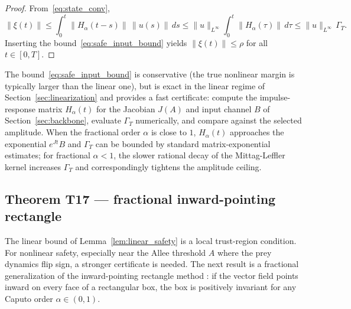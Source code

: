 \begin{proof}
From~\eqref{eq:state_conv},
\[
\|\xi(t)\| \le \int_0^t \|H_\alpha(t - s)\|\,\|u(s)\|\, ds
\le \|u\|_{L^\infty} \int_0^t \|H_\alpha(\tau)\|\, d\tau
\le \|u\|_{L^\infty} \,\Gamma_T.
\]
Inserting the bound~\eqref{eq:safe_input_bound} yields \(\|\xi(t)\| \le \rho\) for all \(t \in [0, T]\).
\end{proof}

The bound~\eqref{eq:safe_input_bound} is conservative (the true nonlinear margin is typically larger than the linear one), but is exact in the linear regime of Section~\ref{sec:linearization} and provides a fast certificate: compute the impulse-response matrix \(H_\alpha(t)\) for the Jacobian \(J(A)\) and input channel \(B\) of Section~\ref{sec:backbone}, evaluate \(\Gamma_T\) numerically, and compare against the selected amplitude. When the fractional order \(\alpha\) is close to \(1\), \(H_\alpha(t)\) approaches the exponential \(e^{Jt}B\) and \(\Gamma_T\) can be bounded by standard matrix-exponential estimates; for fractional \(\alpha < 1\), the slower rational decay of the Mittag-Leffler kernel increases \(\Gamma_T\) and correspondingly tightens the amplitude ceiling.

\subsection{Theorem T17 --- fractional inward-pointing rectangle}

The linear bound of Lemma~\ref{lem:linear_safety} is a local trust-region condition. For nonlinear safety, especially near the Allee threshold \(A\) where the prey dynamics flip sign, a stronger certificate is needed. The next result is a fractional generalization of the inward-pointing rectangle method \citep{halanay1966}: if the vector field points inward on every face of a rectangular box, the box is positively invariant for any Caputo order \(\alpha \in (0, 1)\).

